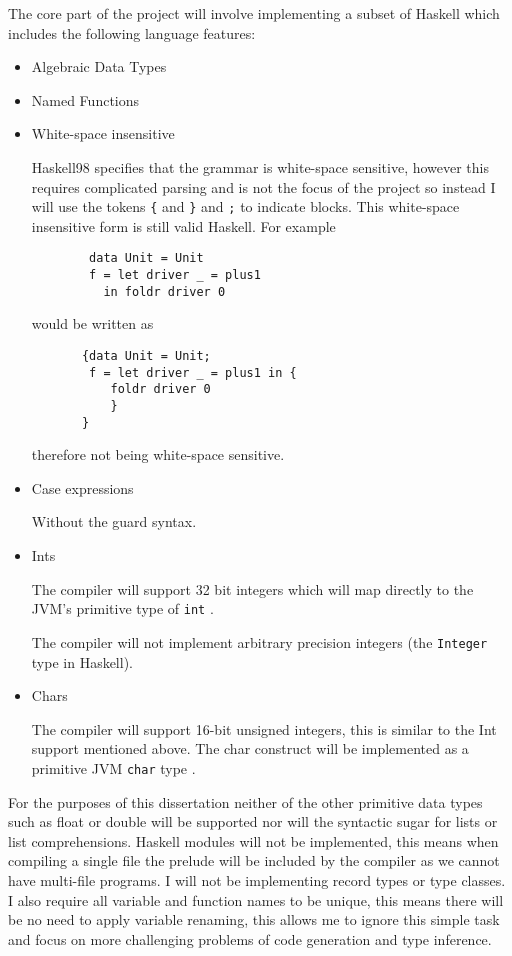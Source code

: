 \documentclass[a4paper]{article}
\begin{document}
  The core part of the project will involve implementing a subset of Haskell which includes the following language features:
  \begin{itemize}
    \item Algebraic Data Types

    \item Named Functions


    \item White-space insensitive

      Haskell98 specifies that the grammar is white-space sensitive, however this requires complicated parsing and is not the focus of the project so instead I will
      use the tokens \texttt{\{} and \texttt{\}} and \texttt{;} to indicate blocks. This white-space insensitive form is still valid Haskell.
      For example
      \begin{verbatim}
        data Unit = Unit
        f = let driver _ = plus1
          in foldr driver 0
      \end{verbatim}
      would be written as
      \begin{verbatim}
       {data Unit = Unit;
        f = let driver _ = plus1 in {
           foldr driver 0
           }
       }
      \end{verbatim}
      therefore not being white-space sensitive.

    \item Case expressions

      Without the guard syntax.

    \item Ints

      The compiler will support 32 bit integers which will map directly to the JVM's primitive type of \texttt{int} \cite{jvm-spec8}.

      The compiler will not implement arbitrary precision integers (the \texttt{Integer} type in Haskell).

    \item Chars

      The compiler will support 16-bit unsigned integers, this is similar to the Int support mentioned above. The char construct will be implemented as a
      primitive JVM \texttt{char} type \cite{jvm-spec8}.


  \end{itemize}
  For the purposes of this dissertation neither of the other primitive data types such as float or double will be supported nor will the syntactic sugar for lists 
  or list comprehensions.
  Haskell modules will not be implemented, this means when compiling a single file the prelude will be included by the compiler as we cannot have multi-file programs.
  I will not be implementing record types or type classes. I also require all variable and function names to be unique, this means there will be no need to apply 
  variable renaming, this allows me to ignore this simple task and focus on more challenging problems of code generation and type inference.
\end{document}
